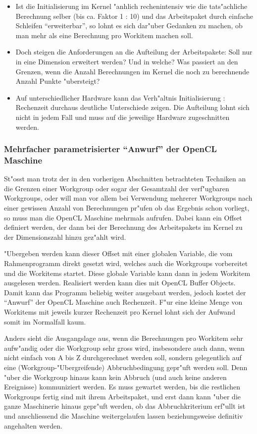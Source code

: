 \begin{refsection}
\begin{itemize}
 \item Ist die Initialisierung im Kernel "anhlich rechenintensiv wie die
       tats"achliche Berechnung selber (bis ca. Faktor 1 : 10) und das 
       Arbeitspaket durch einfache Schleifen ``erweiterbar'', so lohnt
       es sich dar"uber Gedanken zu machen, ob man mehr als eine Berechnung
       pro Workitem machen soll.
 \item Doch steigen die Anforderungen an die Aufteilung der Arbeitspakete:
       Soll nur in eine Dimension erweitert werden? Und in welche? Was 
       passiert an den Grenzen, wenn die Anzahl Berechnungen im Kernel die 
       noch zu berechnende Anzahl Punkte "ubersteigt?
 \item Auf unterschiedlicher Hardware kann das Verh"altnis Initialisierung : 
       Rechenzeit durchaus deutliche Unterschiede zeigen. Die Aufteilung
       lohnt sich nicht in jedem Fall und muss auf die jeweilige Hardware
       zugeschnitten werden.
\end{itemize}




\subsubsection{Mehrfacher parametrisierter ``Anwurf'' der OpenCL Maschine}

St"osst man trotz der in den vorherigen Abschnitten betrachteten Techniken
an die Grenzen einer Workgroup oder sogar der Gesamtzahl der verf"ugbaren
Workgroups, oder will man vor allem bei Verwendung mehrerer Workgroups 
nach einer gewissen Anzahl von Berechnungen pr"ufen ob das Ergebnis schon
vorliegt, so muss man die OpenCL Maschine mehrmals aufrufen. Dabei kann 
ein Offset definiert werden, der dann bei der Berechnung des Arbeitspakets
im Kernel zu der Dimensionszahl hinzu gez"ahlt wird.

"Ubergeben werden kann dieser Offset mit einer globalen Variable, die vom
Rahmenprogramm direkt gesetzt wird, welches auch die Workgroups vorbereitet 
und die Workitems startet. Diese globale Variable kann dann in jedem Workitem
ausgelesen werden. Realisiert werden kann dies mit OpenCL Buffer Objects.
Damit kann das Programm beliebig weiter ausgebaut
werden, jedoch kostet der ``Anwurf'' der OpenCL Maschine auch Rechenzeit.
F"ur eine kleine Menge von Workitems mit jeweils kurzer Rechenzeit pro Kernel
lohnt sich der Aufwand somit im Normalfall kaum. 

Anders sieht die 
Ausgangslage aus, wenn die Berechnungen pro Workitem sehr aufw"andig oder
die Workgroup sehr gross wird, insbesondere auch dann, wenn nicht einfach von 
A bis Z durchgerechnet werden soll, sondern gelegentlich auf eine 
(Workgroup-"Ubergreifende) Abbruchbedingung gepr"uft werden soll. Denn
"uber die Workgroup hinaus kann kein Abbruch (und auch keine anderen 
Ereignisse) kommuniziert werden. Es muss gewartet werden, bis die restlichen
Workgroups fertig sind mit ihrem Arbeitspaket, und erst dann kann "uber
die ganze Maschinerie hinaus gepr"uft werden, ob das Abbruchkriterium
erf"ullt ist und anschliessend die Maschine weitergelaufen lassen 
beziehungsweise definitiv angehalten werden.


\end{refsection}
